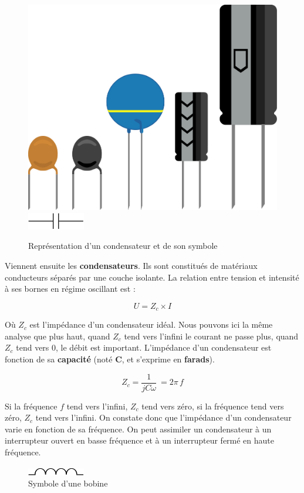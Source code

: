 \documentclass[
]{book}
\begin{document}
\begin{figure}

{\centering \includegraphics[width=0.25\linewidth]{_resources/diagrams/capa} \includegraphics[width=0.25\linewidth]{_resources/diagrams/capa_sym} 

}

\caption{Représentation d'un condensateur et de son symbole}\label{fig:unnamed-chunk-15}
\end{figure}

Viennent ensuite les \textbf{condensateurs}. Ils sont constitués de matériaux conducteurs séparés par une couche isolante. La relation entre tension et intensité à ses bornes en régime oscillant est :

\[ U = Z_c \times I \]

Où \(Z_c\) est l'impédance d'un condensateur idéal. Nous pouvons ici la même analyse que plus haut, quand \(Z_c\) tend vers l'infini le courant ne passe plus, quand \(Z_c\) tend vers 0, le débit est important. L'impédance d'un condensateur est fonction de sa \textbf{capacité} (noté \textbf{C}, et s'exprime en \textbf{farads}).

\[ Z_c = \frac{1}{jC\omega} \> = 2 \pi \, f\]

Si la fréquence \(f\) tend vers l'infini, \(Z_c\) tend vers zéro, si la fréquence tend vers zéro, \(Z_c\) tend vers l'infini. On constate donc que l'impédance d'un condensateur varie en fonction de sa fréquence. On peut assimiler un condensateur à un interrupteur ouvert en basse fréquence et à un interrupteur fermé en haute fréquence.

\begin{figure}

{\centering \includegraphics[width=0.25\linewidth]{_resources/diagrams/inductor_sym} 

}

\caption{Symbole d'une bobine}\label{fig:unnamed-chunk-16}
\end{figure}
\end{document}
